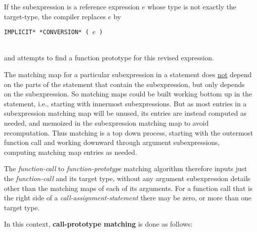 \documentclass[12pt]{article}
\newcommand{\key}[1]{{\rm \bfseries #1}}
\begin{document}
If the subexpression is a reference expression $e$ whose type is not
exactly the target-type, the compiler replaces $e$ by \\
\centerline{\tt *IMPLICIT* *CONVERSION* ( $e$ )} \\[0.5ex]
and attempts to find a function prototype for this revised expression.

The matching map for a particular subexpression in a statement does
\underline{not} depend on the parts of the statement that contain
the subexpression, but only depends on the subexpression.
So matching maps could be built working bottom up in the
statement, i.e., starting with innermost subexpressions.  But
as most entries in a subexpression matching map will be unused, its entries
are instead computed as needed, and memoized in the subexpression
matching map to avoid recomputation.  Thus matching is a top down
process, starting with the outermost function call and working
downward through argument subexpressions, computing matching map
entries as needed.

The {\em function-call} to {\em function-prototype}
matching algorithm therefore
inputs just the {\em function-call} and its target type,
without any argument subexpression details
other than the matching maps of each of its arguments.
For a function call
that is the right side of a {\em call-assignment-statement} there may
be zero, or more than one target type.

In this context, \key{call-prototype matching} is done as follows:
\end{document}
